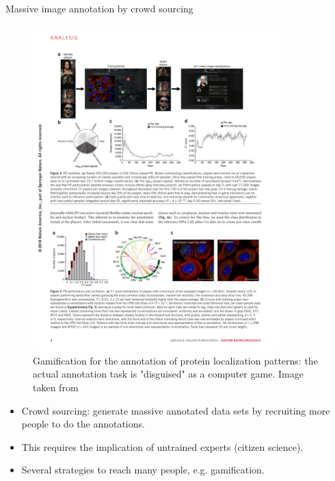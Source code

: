 \documentclass[xcolor=pdftex,dvipsnames,table]{beamer}
\begin{document}
\begin{frame}{Massive image annotation by crowd sourcing}
\begin{figure}[htb]
   \centering
   \includegraphics[width=0.85\textwidth]{../graphics/gamification.pdf}
   \caption{Gamification for the annotation of protein localization patterns: the actual annotation task is "disguised" as a computer game. Image taken from \cite{Sullivan2018a}}
\end{figure}
\begin{itemize}
   \item Crowd sourcing: generate massive annotated data sets by recruiting more people to do the annotations.
   \item This requires the implication of untrained experts (citizen science). 
   \item Several strategies to reach many people, e.g. gamification. 
\end{itemize}
\end{frame}
\end{document}
